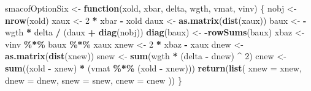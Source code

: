 \documentclass[
  12pt,
]{article}
\newenvironment{Shaded}{\begin{snugshade}}{\end{snugshade}}
\newcommand{\AttributeTok}[1]{\textcolor[rgb]{0.13,0.29,0.53}{#1}}
\newcommand{\ControlFlowTok}[1]{\textcolor[rgb]{0.13,0.29,0.53}{\textbf{#1}}}
\newcommand{\DecValTok}[1]{\textcolor[rgb]{0.00,0.00,0.81}{#1}}
\newcommand{\FunctionTok}[1]{\textcolor[rgb]{0.13,0.29,0.53}{\textbf{#1}}}
\newcommand{\NormalTok}[1]{#1}
\newcommand{\OtherTok}[1]{\textcolor[rgb]{0.56,0.35,0.01}{#1}}
\newcommand{\SpecialCharTok}[1]{\textcolor[rgb]{0.81,0.36,0.00}{\textbf{#1}}}
\begin{document}
\begin{Shaded}
\begin{Highlighting}[]
\NormalTok{smacofOptionSix }\OtherTok{\textless{}{-}} \ControlFlowTok{function}\NormalTok{(xold, xbar, delta, wgth, vmat, vinv) \{}
\NormalTok{  nobj }\OtherTok{\textless{}{-}} \FunctionTok{nrow}\NormalTok{(xold)}
\NormalTok{  xaux }\OtherTok{\textless{}{-}} \DecValTok{2} \SpecialCharTok{*}\NormalTok{ xbar }\SpecialCharTok{{-}}\NormalTok{ xold}
\NormalTok{  daux }\OtherTok{\textless{}{-}} \FunctionTok{as.matrix}\NormalTok{(}\FunctionTok{dist}\NormalTok{(xaux))}
\NormalTok{  baux }\OtherTok{\textless{}{-}} \SpecialCharTok{{-}}\NormalTok{wgth }\SpecialCharTok{*}\NormalTok{ delta }\SpecialCharTok{/}\NormalTok{ (daux }\SpecialCharTok{+} \FunctionTok{diag}\NormalTok{(nobj))}
  \FunctionTok{diag}\NormalTok{(baux) }\OtherTok{\textless{}{-}} \SpecialCharTok{{-}}\FunctionTok{rowSums}\NormalTok{(baux)}
\NormalTok{  xbaz }\OtherTok{\textless{}{-}}\NormalTok{ vinv }\SpecialCharTok{\%*\%}\NormalTok{ baux }\SpecialCharTok{\%*\%}\NormalTok{ xaux}
\NormalTok{  xnew }\OtherTok{\textless{}{-}} \DecValTok{2} \SpecialCharTok{*}\NormalTok{ xbaz }\SpecialCharTok{{-}}\NormalTok{ xaux}
\NormalTok{  dnew }\OtherTok{\textless{}{-}} \FunctionTok{as.matrix}\NormalTok{(}\FunctionTok{dist}\NormalTok{(xnew))}
\NormalTok{  snew }\OtherTok{\textless{}{-}} \FunctionTok{sum}\NormalTok{(wgth }\SpecialCharTok{*}\NormalTok{ (delta }\SpecialCharTok{{-}}\NormalTok{ dnew) }\SpecialCharTok{\^{}} \DecValTok{2}\NormalTok{)}
\NormalTok{  cnew }\OtherTok{\textless{}{-}} \FunctionTok{sum}\NormalTok{((xold }\SpecialCharTok{{-}}\NormalTok{ xnew) }\SpecialCharTok{*}\NormalTok{ (vmat }\SpecialCharTok{\%*\%}\NormalTok{ (xold }\SpecialCharTok{{-}}\NormalTok{ xnew)))}
  \FunctionTok{return}\NormalTok{(}\FunctionTok{list}\NormalTok{(}
    \AttributeTok{xnew =}\NormalTok{ xnew,}
    \AttributeTok{dnew =}\NormalTok{ dnew,}
    \AttributeTok{snew =}\NormalTok{ snew,}
    \AttributeTok{cnew =}\NormalTok{ cnew}
\NormalTok{  ))}
\NormalTok{\}}


\end{Highlighting}
\end{Shaded}
\end{document}
